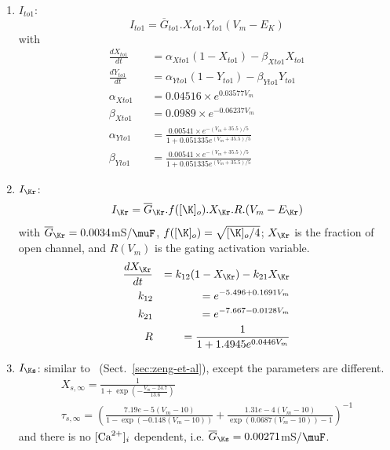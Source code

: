 \begin{enumerate}
\item $I_{to1}$:
  \begin{equation}
    \label{eq:1048}
    I_{to1} = \overline{G}_{to1}.X_{to1}.Y_{to1}(V_m-E_K)
  \end{equation}
with
\begin{eqnarray}
  \label{eq:1052}
  \frac{dX_{to1}}{dt} &&= \alpha_{Xto1}(1-X_{to1})-\beta_{Xto1}X_{to1}
  \\
  \frac{dY_{to1}}{dt} &&= \alpha_{Yto1}(1-Y_{to1})-\beta_{Yto1}Y_{to1}\\
  \alpha_{Xto1} &&= 0.04516\times e^{0.03577V_m}\\
  \beta_{Xto1} &&= 0.0989\times e^{-0.06237V_m}\\
  \alpha_{Yto1} &&= \frac{0.00541\times e^{-(V_m+35.5)/5}}{1+0.051335e^{(V_m+35.5)/5}}\\
    \beta_{Yto1} &&= \frac{0.00541\times e^{-(V_m+35.5)/5}}{1+0.051335e^{(V_m+35.5)/5}}
\end{eqnarray}

\item $I_\Kr$:
  \begin{equation}
    \label{eq:1053}
    I_\Kr = \overline{G}_\Kr . f([\K]_o).X_\Kr . R . (V_m - E_\Kr)
  \end{equation}
  with $\overline{G}_\Kr=0.0034$mS/$\muF$, $f([\K]_o)=\sqrt{[\K]_o/4}$;
  $X_\Kr$ is the fraction of open channel, and $R(V_m)$ is the gating
  activation variable.
\begin{eqnarray}
  \label{eq:1054}
  \frac{dX_\Kr}{dt} &&= k_{12}(1-X_\Kr)-k_{21}X_\Kr \\
  k_{12} &&= e^{-5.496+0.1691V_m} \\
  k_{21} &&=  e^{-7.667-0.0128V_m}  \\
  R &&= \frac{1}{1+1.4945e^{0.0446V_m}}
\end{eqnarray}

\item $I_\Ks$: similar to~\citep{zeng1995}
  (Sect.~\ref{sec:zeng-et-al}), except the parameters are different.
  \begin{equation}
    \label{eq:1311}
    \begin{split}
      X_{s,\infty} = \frac{1}{1+\exp(-\frac{V_m-24.7}{13.6})} \\
      \tau_{s,\infty} = \left( \frac{7.19e-5(V_m-10)}{1-\exp(-0.148(V_m-10))}+\frac{1.31e-4(V_m-10)}{\exp(0.0687(V_m-10))-1}\right)^{-1}
    \end{split}
  \end{equation}
and there is no $[{\text{Ca}^{2+}}]_i$ dependent,
i.e. $\overline{G}_\Ks=0.00271$mS/$\muF$.


\end{enumerate}
